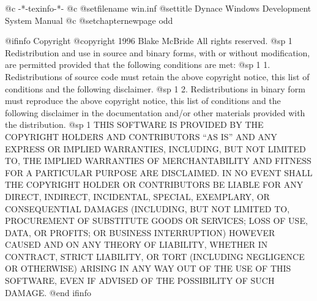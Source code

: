     @c -*-texinfo-*-
@c %
@setfilename win.inf
@settitle Dynace Windows Development System Manual
@c %
@setchapternewpage odd

@ifinfo
Copyright  @copyright{} 1996 Blake McBride
All rights reserved.
@sp 1
Redistribution and use in source and binary forms, with or without
modification, are permitted provided that the following conditions are
met:
@sp 1
1. Redistributions of source code must retain the above copyright
notice, this list of conditions and the following disclaimer.
@sp 1
2. Redistributions in binary form must reproduce the above copyright
notice, this list of conditions and the following disclaimer in the
documentation and/or other materials provided with the distribution.
@sp 1
THIS SOFTWARE IS PROVIDED BY THE COPYRIGHT HOLDERS AND CONTRIBUTORS
``AS IS'' AND ANY EXPRESS OR IMPLIED WARRANTIES, INCLUDING, BUT NOT
LIMITED TO, THE IMPLIED WARRANTIES OF MERCHANTABILITY AND FITNESS FOR
A PARTICULAR PURPOSE ARE DISCLAIMED. IN NO EVENT SHALL THE COPYRIGHT
HOLDER OR CONTRIBUTORS BE LIABLE FOR ANY DIRECT, INDIRECT, INCIDENTAL,
SPECIAL, EXEMPLARY, OR CONSEQUENTIAL DAMAGES (INCLUDING, BUT NOT
LIMITED TO, PROCUREMENT OF SUBSTITUTE GOODS OR SERVICES; LOSS OF USE,
DATA, OR PROFITS; OR BUSINESS INTERRUPTION) HOWEVER CAUSED AND ON ANY
THEORY OF LIABILITY, WHETHER IN CONTRACT, STRICT LIABILITY, OR TORT
(INCLUDING NEGLIGENCE OR OTHERWISE) ARISING IN ANY WAY OUT OF THE USE
OF THIS SOFTWARE, EVEN IF ADVISED OF THE POSSIBILITY OF SUCH DAMAGE.
@end ifinfo

